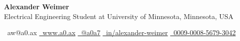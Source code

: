 \documentclass[11pt, a4paper]{russell}
\begin{document}
\begin{center}
\Large{\textbf{Alexander Weimer}} \\
\vspace{0.5em}
\small{Electrical Engineering Student at University of Minnesota, Minnesota, USA} \\
\vspace{0.8em}

\small{
  ~aw@a0.ax
  \quad
  \href{https://a0.ax/}{~www.a0.ax}
  \quad
  \href{https://github.com/a0a7}{~@a0a7}
  \quad
  \href{https://linkedin.com/in/alexander-weimer}{~in/alexander-weimer}
  \quad
  \href{https://orcid.org/0009-0008-5679-3042}{~0009-0008-5679-3042}
}

\vspace{0.8em}
\end{center}

    
    
    
    
    
    


\vspace*{\fill}
\end{document}
